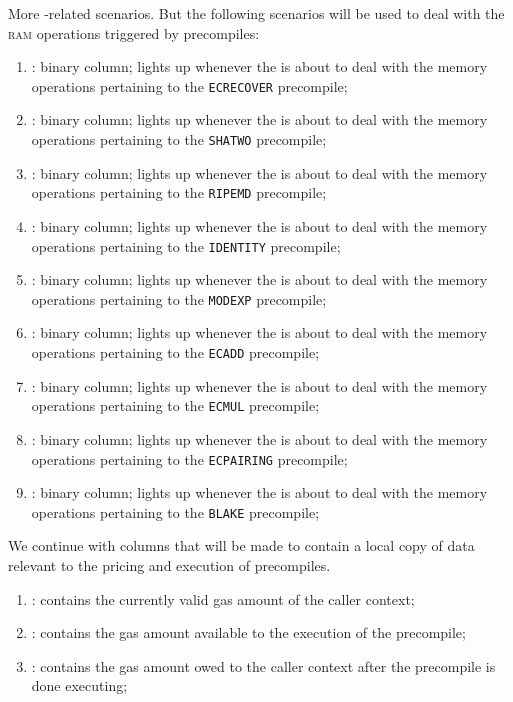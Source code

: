 More -related scenarios. But the following scenarios will be used to deal with the \textsc{ram} operations triggered by precompiles: 
\begin{enumerate}[resume]
	\item \scenEcrecover:
		binary column; lights up whenever the \zkEvm{} is about to deal with the memory operations pertaining to the \texttt{ECRECOVER} precompile;
	\item \scenShaTwo:
		binary column; lights up whenever the \zkEvm{} is about to deal with the memory operations pertaining to the \texttt{SHATWO} precompile;
	\item \scenRipemd:
		binary column; lights up whenever the \zkEvm{} is about to deal with the memory operations pertaining to the \texttt{RIPEMD} precompile;
	\item \scenIdentity:
		binary column; lights up whenever the \zkEvm{} is about to deal with the memory operations pertaining to the \texttt{IDENTITY} precompile;
	\item \scenModexp:
		binary column; lights up whenever the \zkEvm{} is about to deal with the memory operations pertaining to the \texttt{MODEXP} precompile;
	\item \scenEcadd:
		binary column; lights up whenever the \zkEvm{} is about to deal with the memory operations pertaining to the \texttt{ECADD} precompile;
	\item \scenEcmul:
		binary column; lights up whenever the \zkEvm{} is about to deal with the memory operations pertaining to the \texttt{ECMUL} precompile;
	\item \scenEcpairing:
		binary column; lights up whenever the \zkEvm{} is about to deal with the memory operations pertaining to the \texttt{ECPAIRING} precompile;
	\item \scenBlake:
		binary column; lights up whenever the \zkEvm{} is about to deal with the memory operations pertaining to the \texttt{BLAKE} precompile;
\end{enumerate}
We continue with columns that will be made to contain a local copy of data relevant to the pricing and execution of precompiles.
\begin{enumerate}[resume]
	\item \scenPrcCurrentlyValidCallerGas:
		contains the currently valid gas amount of the caller context; 
	\item \scenPrcGasAllowance           :
		contains the gas amount available to the execution of the precompile;
	\item \scenPrcGasOwedToCaller        :
		contains the gas amount owed to the caller context after the precompile is done executing; 
\end{enumerate}
